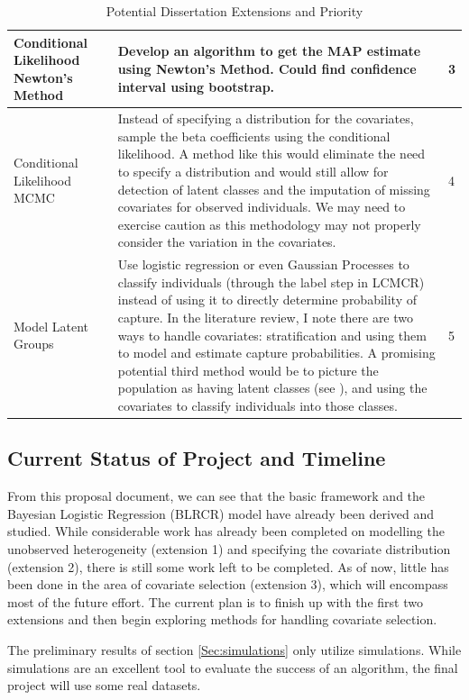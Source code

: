 \documentclass[
  12pt,
]{article}
\begin{document}
\begin{table}[H]
\begin{tabular}{||p{3cm}||p{10cm}|p{1.2cm}||}
  \hline
Conditional Likelihood Newton's Method & Develop an algorithm to get the MAP estimate using Newton's Method.  Could find confidence interval using bootstrap. & 3  \\
 \hline
Conditional Likelihood MCMC & Instead of specifying a distribution for the covariates, sample the beta coefficients using the conditional likelihood. A method like this would eliminate the need to specify a distribution and would still allow for detection of latent classes and the imputation of missing covariates for observed individuals.  We may need to exercise caution as this methodology may not properly consider the variation in the covariates. & 4   \\
 \hline
 Model Latent Groups & Use logistic regression or even Gaussian Processes to classify individuals (through the label step in LCMCR) instead of using it to directly determine probability of capture. In the literature review, I note there are two ways to handle covariates: stratification and using them to model and estimate capture probabilities. A promising potential third method would be to picture the population as having latent classes (see \cite{manriquevallier_bayesian_2016}), and using the covariates to classify individuals into those classes.&  5  \\
 \hline
\end{tabular}
\caption{Potential Dissertation Extensions and Priority}
\label{table:timelinetable}
\end{table}

\subsection{Current Status of Project and Timeline}

From this proposal document, we can see that the basic framework and the
Bayesian Logistic Regression (BLRCR) model have already been derived and
studied. While considerable work has already been completed on modelling
the unobserved heterogeneity (extension 1) and specifying the covariate
distribution (extension 2), there is still some work left to be
completed. As of now, little has been done in the area of covariate
selection (extension 3), which will encompass most of the future effort.
The current plan is to finish up with the first two extensions and then
begin exploring methods for handling covariate selection.

The preliminary results of section \ref{Sec:simulations} only utilize
simulations. While simulations are an excellent tool to evaluate the
success of an algorithm, the final project will use some real datasets.
\end{document}
